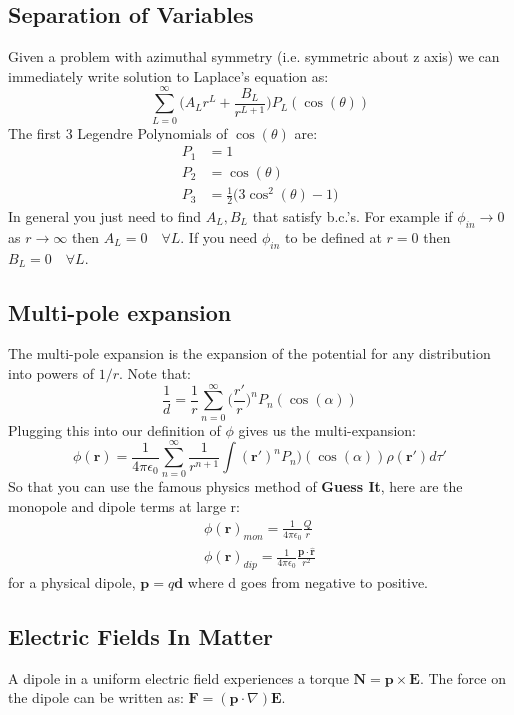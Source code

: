 \documentclass[a4paper, 11pt]{article}
\begin{document}
	\subsection*{Separation of Variables} 
		Given a problem with azimuthal symmetry (i.e. symmetric about z axis) we can immediately write solution to Laplace's equation as: 
			\begin{equation}
				\sum\limits_{L=0}^{\infty}\Big(A_Lr^L + \frac{B_L}{r^{L+1}}\Big)P_L(\cos(\theta))
			\end{equation}
		The first 3 Legendre Polynomials of $\cos(\theta)$ are: 
			\begin{align}
				P_1 &= 1 \\ 
				P_2 &= \cos(\theta) \\ 
				P_3 &= \frac{1}{2}\Big( 3\cos^2(\theta)-1\Big)
			\end{align}
		In general you just need to find $A_L, B_L$ that satisfy b.c.'s. For example if $\phi_{in} \rightarrow 0$ as $r\rightarrow \infty$ then $A_L = 0 \quad \forall L$. If you need $\phi_{in}$ to be defined at $r=0$ then $B_L = 0 \quad \forall L$. 
	\subsection*{Multi-pole expansion} 
		The multi-pole expansion is the expansion of the potential for any distribution into powers of $1/r$. Note that: 
			\begin{equation}
				\frac{1}{d} = \frac{1}{r}\sum\limits_{n=0}^{\infty} \Big( \frac{r'}{r} \Big)^n P_n(\cos(\alpha)) 
			\end{equation}
		Plugging this into our definition of $\phi$ gives us the multi-expansion: 
			\begin{equation}
				\phi(\mathbf{r}) = \frac{1}{4\pi\epsilon_0}\sum\limits_{n=0}^{\infty}\frac{1}{r^{n+1}}\int (\mathbf{r'})^n P_n)(\cos(\alpha))\rho(\mathbf{r'})d\tau' 
			\end{equation}
		So that you can use the famous physics method of \textbf{Guess It}, here are the monopole and dipole terms at large r: 
			\begin{align}
				\phi(\mathbf{r})_{mon} = \frac{1}{4 \pi \epsilon_0}\frac{Q}{r} \\ 
				\phi(\mathbf{r})_{dip} = \frac{1}{4 \pi \epsilon_0} \frac{\mathbf{p} \cdot \hat{\mathbf{r}}}{r^2}
			\end{align}
		for a physical dipole, $\mathbf{p} = q\mathbf{d}$ where d goes from negative to positive. 
	\subsection*{Electric Fields In Matter}
		A dipole in a uniform electric field experiences a torque $\mathbf{N} = \mathbf{p} \times \mathbf{E}$. The force on the dipole can be written as: $\mathbf{F} = (\mathbf{p} \cdot \nabla)\mathbf{E}$. \\ 
		
\end{document}
